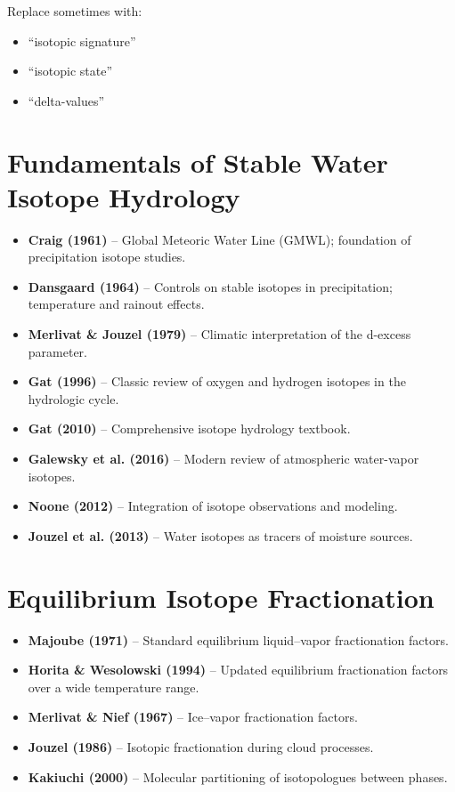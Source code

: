 \documentclass[11pt,a4paper]{article}
\begin{document}
Replace sometimes with:

\begin{itemize}
\item “isotopic signature”
\item “isotopic state”
\item “delta-values”
\end{itemize}


\section{Fundamentals of Stable Water Isotope Hydrology}
\begin{itemize}
    \item \textbf{Craig (1961)} -- Global Meteoric Water Line (GMWL); foundation of precipitation isotope studies.
    \item \textbf{Dansgaard (1964)} -- Controls on stable isotopes in precipitation; temperature and rainout effects.
    \item \textbf{Merlivat \& Jouzel (1979)} -- Climatic interpretation of the d-excess parameter.
    \item \textbf{Gat (1996)} -- Classic review of oxygen and hydrogen isotopes in the hydrologic cycle.
    \item \textbf{Gat (2010)} -- Comprehensive isotope hydrology textbook.
    \item \textbf{Galewsky et al. (2016)} -- Modern review of atmospheric water-vapor isotopes.
    \item \textbf{Noone (2012)} -- Integration of isotope observations and modeling.
    \item \textbf{Jouzel et al. (2013)} -- Water isotopes as tracers of moisture sources.
\end{itemize}

\section{Equilibrium Isotope Fractionation}
\begin{itemize}
    \item \textbf{Majoube (1971)} -- Standard equilibrium liquid--vapor fractionation factors.
    \item \textbf{Horita \& Wesolowski (1994)} -- Updated equilibrium fractionation factors over a wide temperature range.
    \item \textbf{Merlivat \& Nief (1967)} -- Ice--vapor fractionation factors.
    \item \textbf{Jouzel (1986)} -- Isotopic fractionation during cloud processes.
    \item \textbf{Kakiuchi (2000)} -- Molecular partitioning of isotopologues between phases.
\end{itemize}
\end{document}
